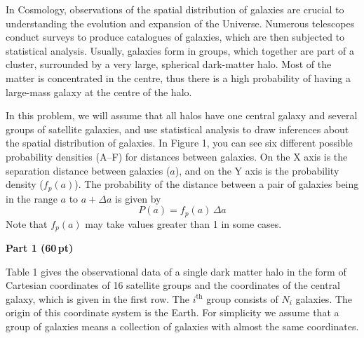In Cosmology, observations of the spatial distribution of galaxies are crucial
to understanding the evolution and expansion of the Universe. Numerous
telescopes conduct surveys to produce catalogues of galaxies, which are then
subjected to statistical analysis. Usually, galaxies form in groups, which
together are part of a cluster, surrounded by a very large, spherical
dark-matter halo. Most of the matter is concentrated in the centre, thus there
is a high probability of having a large-mass galaxy at the centre of the halo.

In this problem, we will assume that all halos have one central galaxy and
several groups of satellite galaxies, and use statistical analysis to draw
inferences about the spatial distribution of galaxies. In Figure 1, you can
see six different possible probability densities (A--F) for distances between
galaxies. On the X axis is the separation distance between galaxies ($a$), and
on the Y axis is the probability density ($f_p(a)$). The probability of the
distance between a pair of galaxies being in the range $a$ to $a + \Delta a$
is given by
\[ P(a) = f_p(a)\,\Delta a \]
Note that $f_p(a)$ may take values greater than 1 in some cases.


\medskip
\textbf{Part 1 (60\,pt)}

Table 1 gives the observational data of a single dark matter halo in the form
of Cartesian coordinates of 16 satellite groups and the coordinates of the
central galaxy, which is given in the first row. The $i^{\mathrm{th}}$ group
consists of $N_i$ galaxies. The origin of this coordinate system is the Earth.
For simplicity we assume that a group of galaxies means a collection of
galaxies with almost the same coordinates.

